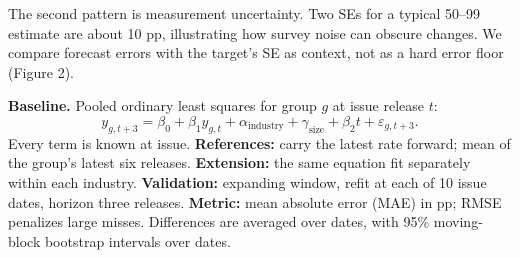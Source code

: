\documentclass[10pt]{article}
\renewcommand{\section}[1]{\needspace{5\baselineskip}\vspace{5pt}{\large\bfseries #1\par}\vspace{1pt}}
\begin{document}
The second pattern is measurement uncertainty. Two SEs for a typical 50--99 estimate are about 10 pp, illustrating how survey noise can obscure changes. We compare forecast errors with the target's SE as context, not as a hard error floor (Figure 2).

\section{4. Baseline and results}
\textbf{Baseline.} Pooled ordinary least squares for group $g$ at issue release $t$:
\[ y_{g,t+3} = \beta_0 + \beta_1 y_{g,t} + \alpha_{\text{industry}} + \gamma_{\text{size}} + \beta_2 t + \varepsilon_{g,t+3}. \]
Every term is known at issue. \textbf{References:} carry the latest rate forward; mean of the group's latest six releases. \textbf{Extension:} the same equation fit separately within each industry. \textbf{Validation:} expanding window, refit at each of 10 issue dates, horizon three releases. \textbf{Metric:} mean absolute error (MAE) in pp; RMSE penalizes large misses. Differences are averaged over dates, with 95\% moving-block bootstrap intervals over dates.
\end{document}
